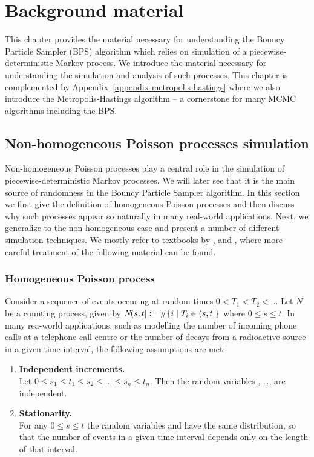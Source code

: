 \documentclass[report.tex]{subfiles}
\begin{document}
\chapter{Background material}

This chapter provides the material necessary for understanding the
Bouncy Particle Sampler (BPS) algorithm which relies on simulation of a
piecewise-deterministic Markov process.
We introduce the material necessary
for understanding the simulation and analysis of such processes.
This chapter is complemented by Appendix~\ref{appendix-metropolis-hastings}
where we also introduce the Metropolis-Hastings algorithm
-- a cornerstone for many MCMC algorithms including the BPS.


\section{Non-homogeneous Poisson processes simulation}
\label{background-material-poisson-processes}


Non-homogeneous Poisson processes play a central role in the simulation of
piecewise-deterministic Markov processes. We will later see that it is
the main source of randomness in the Bouncy Particle Sampler algorithm.
In this section we first give the definition of homogeneous Poisson processes
and then discuss why such processes appear so naturally in many real-world applications.
Next, we generalize to the non-homogeneous case and present a number of different
simulation techniques.
We mostly refer to textbooks by
\citet{devroye2013non},
\citet{feller1968Introduction} and
\citet{ross1996stochastic},
where more careful treatment of the following material can be found.

\subsection{Homogeneous Poisson process}

Consider a sequence of events occuring at random times
$0 < T_{1} < T_{2} < \dots$ Let $N$ be a counting process, given by
${N}\!({s},{t}] \coloneqq \# \{ i \mid T_{i} \in (s, t] \}$ where
$0 \leq s \leq t$.
In many rea-world applications, such as modelling the number of incoming
phone calls at a telephone call centre or the number of decays from a
radioactive source in a given time interval, the following assumptions are met:

\begin{enumerate}
  \item \textbf{Independent increments.} \\
  Let $0 \leq s_{1} \leq t_{1} \leq s_{2} \leq \dots \leq s_{n} \leq t_{n}$.
  Then the random variables
  , \dots, 
  are independent.

  \item \textbf{Stationarity.} \\
  For any $0 \leq s \leq t$ the random variables
   and 
  have the same distribution, so that the number of events in a given time
  interval depends only on the length of that interval.
\end{enumerate}
\end{document}
